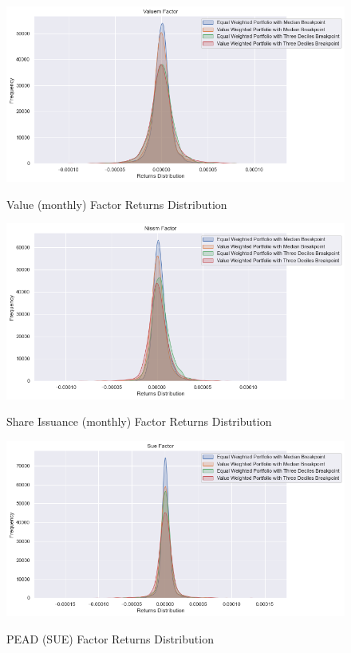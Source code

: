 \begin{figure}[H]
	\caption{Value (monthly) Factor Returns Distribution}
	\centering
	\includegraphics[scale=.63]{../../output/figures/valuem.png}
	\label{fig:valuem}
\end{figure}

\begin{figure}[H]
	\caption{Share Issuance (monthly) Factor Returns Distribution}
	\centering
	\includegraphics[scale=.63]{../../output/figures/nissm.png}
	\label{fig:nissm}
\end{figure}

\begin{figure}[H]
	\caption{PEAD (SUE) Factor Returns Distribution}
	\centering
	\includegraphics[scale=.63]{../../output/figures/sue.png}
	\label{fig:sue}
\end{figure}

